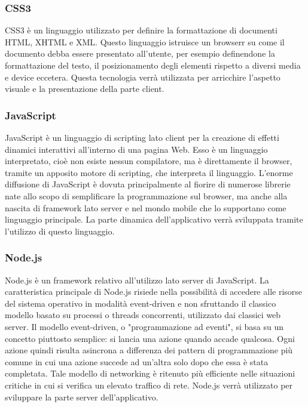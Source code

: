 \subsubsection{CSS3}
CSS3 è un linguaggio utilizzato per definire la formattazione di documenti HTML, XHTML e XML.
Questo linguaggio istruisce un browserr su come il documento debba essere presentato all'utente, per esempio definendone la formattazione del testo, il posizionamento degli elementi rispetto a diversi media e device eccetera.
Questa tecnologia verrà utilizzata per arricchire l'aspetto visuale e la presentazione della parte client.

\subsubsection{JavaScript}
JavaScript è un linguaggio di scripting lato client per la creazione di effetti dinamici interattivi all'interno di una pagina Web. Esso è un linguaggio interpretato, cioè non esiste nessun compilatore, ma è direttamente il browser, tramite un apposito motore di scripting, che interpreta il linguaggio.
L'enorme diffusione di JavaScript è dovuta principalmente al fiorire di numerose librerie nate allo scopo di semplificare la programmazione sul browser, ma anche alla nascita di framework lato server e nel mondo mobile che lo supportano come linguaggio principale.
La parte dinamica dell'applicativo verrà sviluppata tramite l'utilizzo di questo linguaggio.

\subsubsection{Node.js}
Node.js è un framework relativo all'utilizzo lato server di JavaScript.
La caratteristica principale di Node.js risiede nella possibilità di accedere alle risorse del sistema operativo in modalità event-driven e non sfruttando il classico modello basato su processi o threads concorrenti, utilizzato dai classici web server.
Il modello event-driven, o "programmazione ad eventi", si basa su un concetto piuttosto semplice: si lancia una azione quando accade qualcosa. Ogni azione quindi risulta asincrona a differenza dei pattern di programmazione più comune in cui una azione succede ad un'altra solo dopo che essa è stata completata.
Tale modello di networking è ritenuto più efficiente nelle situazioni critiche in cui si verifica un elevato traffico di rete.
Node.js verrà utilizzato per sviluppare la parte server dell'applicativo.



